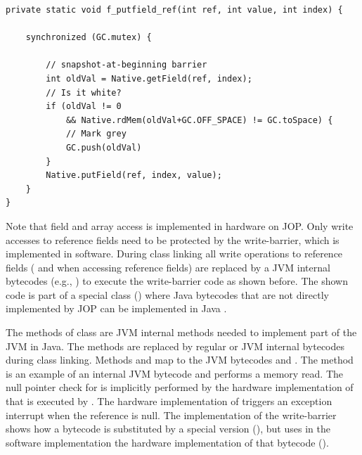 \begin{lstlisting}
private static void f_putfield_ref(int ref, int value, int index) {

    synchronized (GC.mutex) {

        // snapshot-at-beginning barrier
        int oldVal = Native.getField(ref, index);
        // Is it white?
        if (oldVal != 0
            && Native.rdMem(oldVal+GC.OFF_SPACE) != GC.toSpace) {
            // Mark grey
            GC.push(oldVal)
        }
        Native.putField(ref, index, value);
    }
}
\end{lstlisting}


Note that field and array access is implemented in hardware on JOP.
Only write accesses to reference fields need to be protected by the
write-barrier, which is implemented in software. During class linking
all write operations to reference fields ( and
 when accessing reference fields) are replaced by a
JVM internal bytecodes (e.g., ) to execute the
write-barrier code as shown before.
The shown code is part of a special class
() where Java bytecodes that are not
directly implemented by JOP can be implemented in Java
\cite{jop:thesis}. %

The methods of class  are JVM internal methods needed to
implement part of the JVM in Java. The methods are replaced by
regular or JVM internal bytecodes during class linking. Methods
 and 
map to the JVM bytecodes  and . The
method  is an example of an internal JVM bytecode and
performs a memory read. The null pointer check for
 is implicitly performed by the hardware
implementation of  that is executed by
. The hardware implementation of
 triggers an exception interrupt when the reference is
null. The implementation of the write-barrier shows how a bytecode is
substituted by a special version (), but uses in
the software implementation the hardware implementation of that
bytecode ().

